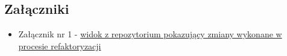 \documentclass[12pt,a4paper,oneside]{article}
\theoremstyle{definition}
\numberwithin{equation}{section}
\begin{document}
\subsection{Załączniki}
\begin{itemize}
	\item Załącznik nr 1 - \href{https://github.com/lukaszgo1/engineering_project_2022/compare/f9c7b4b4471328247d29f7ea80d224014c813a3f..2aa6554e84ff5522b41a2d0e4d7d3185f37de50d}{widok z repozytorium pokazujący zmiany wykonane w procesie refaktoryzacji}
\end{itemize}



\renewcommand\refname{Literatura (jeżeli wymagana)}

\end{document}
